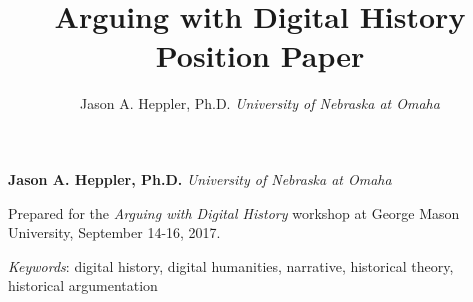 \documentclass[11pt,]{article}
\title{Arguing with Digital History Position Paper  }
\author{\Large Jason A. Heppler, Ph.D.\vspace{0.05in} \newline\normalsize\emph{University of Nebraska at Omaha}  }
\date{}
\newcommand*{\authorfont}{\fontfamily{phv}\selectfont}
\renewenvironment{abstract}
 {{%
    \setlength{\leftmargin}{0mm}
    \setlength{\rightmargin}{\leftmargin}%
  }%
  \relax}
 {\endlist}
\begin{document}
	
%

{%
\setlength{\parindent}{0pt}
\thispagestyle{plain}
{\fontsize{18}{20}\selectfont\raggedright 
\maketitle  %

}

{
   \vskip 13.5pt\relax \normalsize\fontsize{11}{12} 
\textbf{\authorfont Jason A. Heppler, Ph.D.} \hskip 15pt \emph{\small University of Nebraska at Omaha}   

}

}







\begin{abstract}

    \hbox{\vrule height .2pt width 39.14pc}

    \vskip 8.5pt %

\noindent Prepared for the \emph{Arguing with Digital History} workshop at George
Mason University, September 14-16, 2017.


\vskip 8.5pt \noindent \emph{Keywords}: digital history, digital humanities, narrative, historical theory,
historical argumentation \par

    \hbox{\vrule height .2pt width 39.14pc}



\end{abstract}


\vskip 6.5pt
\end{document}
